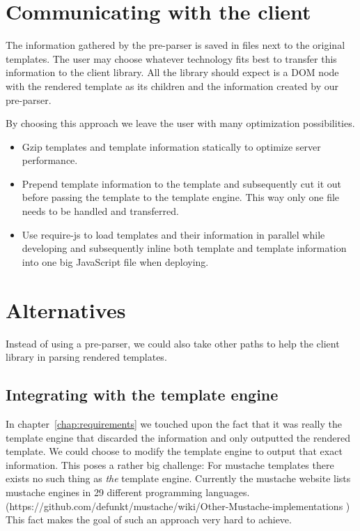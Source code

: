 \documentclass[thesis.tex]{subfiles}
\begin{document}
\section{Communicating with the client}

The information gathered by the pre-parser is saved in files next to the
original templates. The user may choose whatever technology fits best to
transfer this information to the client library. All the library should expect
is a DOM node with the rendered template as its children and the information
created by our pre-parser.

By choosing this approach we leave the user with many optimization
possibilities.
\begin{itemize}
\item Gzip templates and template information statically to optimize
      server performance.
\item Prepend template information to the template and subsequently
      cut it out before passing the template to the template engine.
      This way only one file needs to be handled and transferred.
\item Use require-js to load templates and their information in parallel
      while developing and subsequently inline both template and
      template information into one big JavaScript file when deploying.
\end{itemize}

\section{Alternatives}

Instead of using a pre-parser, we could also take other paths to help
the client library in parsing rendered templates.

\subsection{Integrating with the template engine}

In chapter~\ref{chap:requirements} we touched upon the fact that it was really
the template engine that discarded the information and only outputted the
rendered template. We could choose to modify the template engine to output that
exact information. This poses a rather big challenge:
For mustache templates there exists no such thing as \emph{the} template engine.
Currently the mustache website lists mustache engines in 29 different
programming languages. (https://github.com/defunkt/mustache/wiki/Other-Mustache-implementations )
This fact makes the goal of such an approach very hard to achieve.
\end{document}
